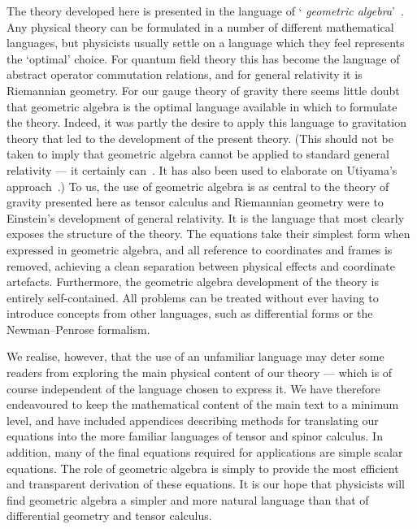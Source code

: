 \documentclass[a4paper]{article}
\numberwithin{equation}{section}
\begin{document}
The theory developed here is presented in the language of `{\em
geometric algebra}'~\cite{hes-gc,DGL93-notreal}.  Any physical theory
can be formulated in a number of different mathematical languages, but
physicists usually settle on a language which they feel represents the
`optimal' choice.  For quantum field theory this has become the
language of abstract operator commutation relations, and for general relativity it is
Riemannian geometry.  For our gauge theory of gravity there seems
little doubt that geometric algebra is the optimal language available
in which to formulate the theory.  Indeed, it was partly the desire to
apply this language to gravitation theory that led to the development
of the present theory.  (This should not be taken to imply that
geometric algebra cannot be applied to standard general relativity --- it certainly
can~\cite{hes-gc,hes86,hes-sta,sob81}.  It has also been used to
elaborate on Utiyama's approach~\cite{hes-sta}.)  To us, the use of
geometric algebra is as central to the theory of gravity presented
here as tensor calculus and Riemannian geometry were to Einstein's
development of general relativity.  It is the language that most clearly exposes the
structure of the theory.  The equations take their simplest form when
expressed in geometric algebra, and all reference to coordinates and
frames is removed, achieving a clean separation between physical
effects and coordinate artefacts.  Furthermore, the geometric algebra
development of the theory is entirely self-contained.  All problems
can be treated without ever having to introduce concepts from other
languages, such as differential forms or the Newman--Penrose formalism.


We realise, however, that the use of an unfamiliar language may deter
some readers from exploring the main physical content of our theory
--- which is of course independent of the language chosen to express
it.  We have therefore endeavoured to keep the mathematical content of
the main text to a minimum level, and have included appendices
describing methods for translating our equations into the more
familiar languages of tensor and spinor calculus.  In addition, many
of the final equations required for applications are simple scalar
equations.  The role of geometric algebra is simply to provide the
most efficient and transparent derivation of these equations.  It is
our hope that physicists will find geometric algebra a simpler and
more natural language than that of differential geometry and tensor
calculus.
\end{document}

